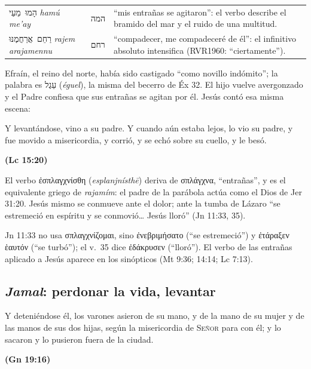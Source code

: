 \documentclass[11pt,letterpaper]{article}
\newcommand{\heb}[1]{\mbox{\foreignlanguage{hebrew}{#1}}}
\newcommand{\grc}[1]{\foreignlanguage{ancientgreek}{#1}}
\newcommand{\hebverso}[1]{\par\smallskip{\centering\begin{otherlanguage}{hebrew}\large #1\end{otherlanguage}\par}\smallskip}
\newcommand{\SENOR}{\textsc{Señor}}
\newcommand{\fuente}[1]{\par\hfill{\upshape\bfseries\small\textcolor{azul}{#1}}}
\begin{document}
\begin{filologia}[Jer 31:20]
\begin{tabular}{@{}L{3.2cm}L{1.6cm}L{10cm}@{}}
\heb{הָמוּ מֵעַי} \emph{hamú me'ay} & \heb{המה} & ``mis entrañas se agitaron'': el verbo describe el bramido del mar y el ruido de una multitud. \\[2pt]
\heb{רַחֵם אֲרַחֲמֶנּוּ} \emph{rajem arajamennu} & \heb{רחם} & ``compadecer, me compadeceré de él'': el infinitivo absoluto intensifica (RVR1960: ``ciertamente''). \\
\end{tabular}
\end{filologia}

Efraín, el reino del norte, había sido castigado ``como novillo indómito''; la palabra es \heb{עֵגֶל} (\emph{éguel}), la misma del becerro de Éx 32. El hijo vuelve avergonzado y el Padre confiesa que sus entrañas se agitan por él. Jesús contó esa misma escena:

\begin{cita}Y levantándose, vino a su padre. Y cuando aún estaba lejos, lo vio su padre, y fue movido a misericordia, y corrió, y se echó sobre su cuello, y le besó.\fuente{(Lc 15:20)}\end{cita}

El verbo \grc{ἐσπλαγχνίσθη} (\emph{esplanjnísthē}) deriva de \grc{σπλάγχνα}, ``entrañas'', y es el equivalente griego de \emph{rajamím}: el padre de la parábola actúa como el Dios de Jer 31:20. Jesús mismo se conmueve ante el dolor; ante la tumba de Lázaro ``se estremeció en espíritu y se conmovió\ldots{} Jesús lloró'' (Jn 11:33, 35).

\begin{nota}[Precisión]
Jn 11:33 no usa \grc{σπλαγχνίζομαι}, sino \grc{ἐνεβριμήσατο} (``se estremeció'') y \grc{ἐτάραξεν ἑαυτόν} (``se turbó''); el v.~35 dice \grc{ἐδάκρυσεν} (``lloró''). El verbo de las entrañas aplicado a Jesús aparece en los sinópticos (Mt 9:36; 14:14; Lc 7:13).
\end{nota}

\subsection{\emph{Jamal}: perdonar la vida, levantar}
\hebverso{בְּחֶמְלַת יְהוָה עָלָיו}
\begin{cita}Y deteniéndose él, los varones asieron de su mano, y de la mano de su mujer y de las manos de sus dos hijas, según la misericordia de \SENOR{} para con él; y lo sacaron y lo pusieron fuera de la ciudad.\fuente{(Gn 19:16)}\end{cita}
\end{document}
